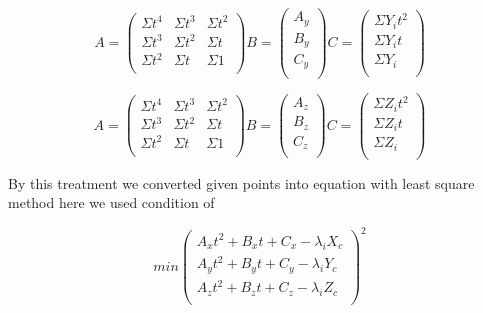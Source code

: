 \begin{equation}
A = 
\begin{pmatrix}
  \Sigma t^4 & \Sigma t^3 & \Sigma t^2\\
  \Sigma t^3 & \Sigma t^2 & \Sigma t\\
  \Sigma t^2 & \Sigma t & \Sigma 1\\
 \end{pmatrix}
B = 
\begin{pmatrix}
  A_y \\
  B_y \\
  C_y \\
 \end{pmatrix}
 C = 
\begin{pmatrix}
  \Sigma Y_i t ^2 \\
  \Sigma Y_i t \\
  \Sigma Y_i \\
 \end{pmatrix}
\end{equation}

\begin{equation}
A = 
\begin{pmatrix}
  \Sigma t^4 & \Sigma t^3 & \Sigma t^2\\
  \Sigma t^3 & \Sigma t^2 & \Sigma t\\
  \Sigma t^2 & \Sigma t & \Sigma 1\\
 \end{pmatrix}
B = 
\begin{pmatrix}
  A_z \\
  B_z \\
  C_z \\
 \end{pmatrix}
 C = 
\begin{pmatrix}
  \Sigma Z_i t ^2 \\
  \Sigma Z_i t \\
  \Sigma Z_i \\
 \end{pmatrix}
\end{equation}

By this treatment we converted given points into equation with least square method here we used condition of 

\begin{equation}
min
\begin{pmatrix}
  A_x t^2 + B_x t + C_x -\lambda_i X_c \\
  A_y t^2 + B_y t + C_y -\lambda_i Y_c \\
  A_z t^2 + B_z t + C_z -\lambda_i Z_c \\
 \end{pmatrix}^2
 \end{equation}
 
